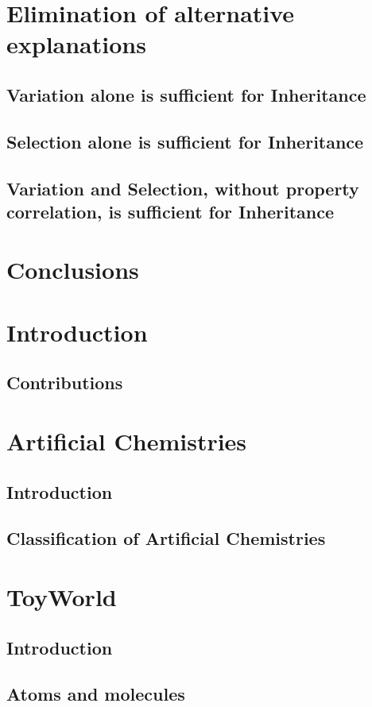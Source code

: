 \documentclass[]{report}
\begin{document}
\chapter{Elimination of alternative explanations}
\section{Variation alone is sufficient for Inheritance}
\section{Selection alone is sufficient for Inheritance}
\section{Variation and Selection, without property correlation, is sufficient for Inheritance}

\chapter{Conclusions}

\chapter{Introduction}\label{part-two}
\section{Contributions}

\chapter{Artificial Chemistries}
\section{Introduction}
\section{Classification of Artificial Chemistries}

\chapter{ToyWorld}
\section{Introduction}
\section{Atoms and molecules}
\end{document}
